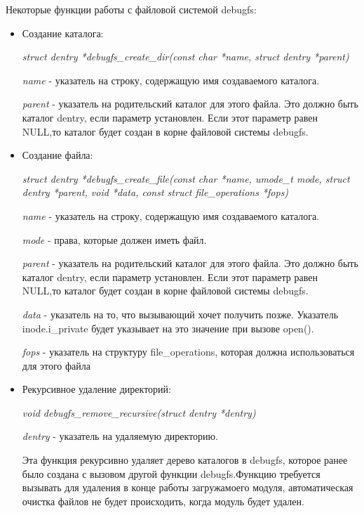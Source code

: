 Некоторые функции работы с файловой системой debugfs:
\begin{itemize}
	\item Создание каталога:
	
	\textit{struct dentry *debugfs\_create\_dir(const char *name, struct dentry *parent)}

	
	\textit{name} - указатель на строку, содержащую имя создаваемого каталога.
	
	\textit{parent} - указатель на родительский каталог для этого файла. Это должно быть каталог dentry, если параметр установлен. Если этот параметр равен NULL,то каталог будет создан в корне файловой системы debugfs.
	\item Создание файла:
	
	\textit{ struct dentry *debugfs\_create\_file(const char *name, umode\_t mode,
	struct dentry *parent, void *data,
	const struct file\_operations *fops)}

	\textit{name} - указатель на строку, содержащую имя создаваемого каталога.
	
	\textit{mode} - права, которые должен иметь файл.
	
	\textit{parent} - указатель на родительский каталог для этого файла. Это должно быть каталог dentry, если параметр установлен. Если этот параметр равен NULL,то каталог будет создан в корне файловой системы debugfs.
	
	\textit{data} -  указатель на то, что вызывающий хочет получить позже. Указатель inode.i\_private  будет указывает на это значение при  вызове open().
	
	\textit{fops} - указатель на структуру file\_operations, которая должна использоваться для этого файла
	
	\item{Рекурсивное удаление директорий:}
	
	\textit{void debugfs\_remove\_recursive(struct dentry *dentry)}
	
	\textit{dentry} - указатель на удаляемую директорию.
	
	Эта функция рекурсивно удаляет дерево каталогов в debugfs, которое
	 ранее было создана с вызовом другой функции debugfs.Функцию требуется вызывать для удаления в конце работы загружамоего модуля, автоматическая очистка файлов не будет происходить, когда модуль  будет удален.
	

\end{itemize}




